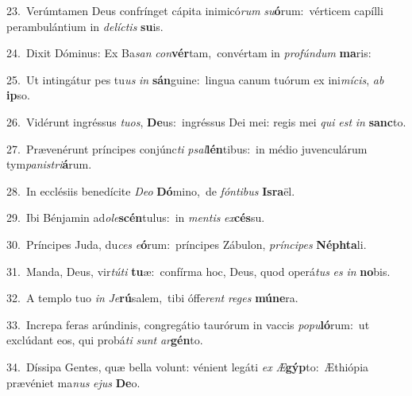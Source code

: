 {\numbfont\textcolor{\numbcolor}{23.}}~Verúmtamen Deus confrínget cápita inimicó\textit{rum} \textit{su}\-\textbf{ó}rum:~\star vérticem capílli perambulántium in \textit{de}\-\textit{líc}\textit{tis} \textbf{su}\-is.\par
{\numbfont\textcolor{\numbcolor}{24.}}~Dixit Dóminus: Ex Ba\textit{san} \textit{con}\-\textbf{vér}tam,~\star convértam in \textit{pro}\-\textit{fún}\textit{dum} \textbf{ma}\-ris:\par
{\numbfont\textcolor{\numbcolor}{25.}}~Ut intingátur pes tu\textit{us} \textit{in} \textbf{sán}\-guine:~\star lingua canum tuórum ex ini\-\textit{mí}\-\textit{cis}, \textit{ab} \textbf{ip}\-so.\par
{\numbfont\textcolor{\numbcolor}{26.}}~Vidérunt ingréssus \textit{tu}\-\textit{os}, \textbf{De}\-us:~\star ingréssus Dei mei: regis mei \textit{qui} \textit{est} \textit{in} \textbf{sanc}\-to.\par
{\numbfont\textcolor{\numbcolor}{27.}}~Prævenérunt príncipes conjúnc\textit{ti} \textit{psal}\-\textbf{lén}tibus:~\star in médio juvenculárum tym\-\textit{pa}\-\textit{nis}\textit{tri}\textbf{á}rum.\par
{\numbfont\textcolor{\numbcolor}{28.}}~In ecclésiis benedícite \textit{De}\-\textit{o} \textbf{Dó}\-mino,~\star de \textit{fón}\-\textit{ti}\textit{bus} \textbf{Is}\-\textbf{ra}ël.\par
{\numbfont\textcolor{\numbcolor}{29.}}~Ibi Bénjamin ad\-\textit{o}\-\textit{le}\textbf{scén}tulus:~\star in \textit{men}\-\textit{tis} \textit{ex}\-\textbf{cés}su.\par
{\numbfont\textcolor{\numbcolor}{30.}}~Príncipes Juda, du\textit{ces} \textit{e}\-\textbf{ó}rum:~\star príncipes Zábulon, \textit{prín}\-\textit{ci}\textit{pes} \textbf{Néph}\-\textbf{ta}li.\par
{\numbfont\textcolor{\numbcolor}{31.}}~Manda, Deus, vir\-\textit{tú}\-\textit{ti} \textbf{tu}\-æ:~\star confírma hoc, Deus, quod operá\textit{tus} \textit{es} \textit{in} \textbf{no}\-bis.\par
{\numbfont\textcolor{\numbcolor}{32.}}~A templo tuo \textit{in} \textit{Je}\-\textbf{rú}salem,~\star tibi óffe\textit{rent} \textit{re}\-\textit{ges} \textbf{mú}\-\textbf{ne}ra.\par
{\numbfont\textcolor{\numbcolor}{33.}}~Increpa feras arúndinis, congregátio taurórum in vaccis \textit{po}\-\textit{pu}\textbf{ló}rum:~\star ut exclúdant eos, qui probá\textit{ti} \textit{sunt} \textit{ar}\-\textbf{gén}to.\par
{\numbfont\textcolor{\numbcolor}{34.}}~Díssipa Gentes, quæ bella volunt: vénient legáti \textit{ex} \textit{Æ}\-\textbf{gýp}to:~\star Æthiópia prævéniet ma\textit{nus} \textit{e}\-\textit{jus} \textbf{De}\-o.\par
